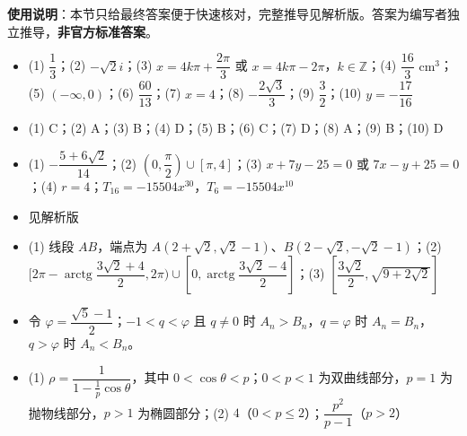 
\begin{gknotice}
\textbf{使用说明}：本节只给最终答案便于快速核对，完整推导见解析版。答案为编写者独立推导，\textbf{非官方标准答案}。
\end{gknotice}

\begin{itemize}[leftmargin=2.6em]
  \item[\textbf{1.}] (1) $\dfrac13$；(2) $-\sqrt2 i$；(3) $x=4k\pi+\dfrac{2\pi}3$ 或 $x=4k\pi-2\pi$，$k\in\mathbb Z$；(4) $\dfrac{16}3\text{ cm}^3$；(5) $(-\infty,0)$；(6) $\dfrac{60}{13}$；(7) $x=4$；(8) $-\dfrac{2\sqrt3}3$；(9) $\dfrac32$；(10) $y=-\dfrac{17}{16}$
  \item[\textbf{2.}] (1) C；(2) A；(3) B；(4) D；(5) B；(6) C；(7) D；(8) A；(9) B；(10) D
  \item[\textbf{3.}] (1) $-\dfrac{5+6\sqrt2}{14}$；(2) $(0,\dfrac\pi2)\cup[\pi,4]$；(3) $x+7y-25=0$ 或 $7x-y+25=0$；(4) $r=4$；$T_{16}=-15504x^{30}$，$T_6=-15504x^{10}$
  \item[\textbf{4.}] 见解析版
  \item[\textbf{5.}] (1) 线段 $AB$，端点为 $A(2+\sqrt2,\sqrt2-1)$、$B(2-\sqrt2,-\sqrt2-1)$；(2) $[2\pi-\operatorname{arctg}\dfrac{3\sqrt2+4}{2},2\pi)\cup[0,\operatorname{arctg}\dfrac{3\sqrt2-4}{2}]$；(3) $[\dfrac{3\sqrt2}{2},\sqrt{9+2\sqrt2}]$
  \item[\textbf{6.}] 令 $\varphi=\dfrac{\sqrt5-1}{2}$；$-1<q<\varphi$ 且 $q\ne0$ 时 $A_n>B_n$，$q=\varphi$ 时 $A_n=B_n$，$q>\varphi$ 时 $A_n<B_n$。
  \item[\textbf{7.}] (1) $\rho=\dfrac1{1-\frac1p\cos\theta}$，其中 $0<\cos\theta<p$；$0<p<1$ 为双曲线部分，$p=1$ 为抛物线部分，$p>1$ 为椭圆部分；(2) $4$（$0<p\le2$）；$\dfrac{p^2}{p-1}$（$p>2$）
\end{itemize}
